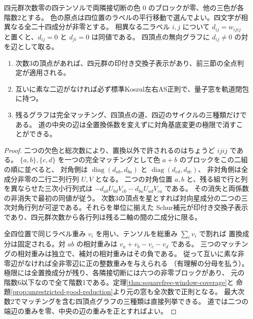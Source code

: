 \begin{proposition}\label{prop:klein-unmarked-matching-reduction}
四元群次数零の四テンソルで両隣接切断の色 $0$ のブロックが零、他の三色が各階数2とする。
色の原点は四位置のラベルの平行移動で選んでよい。四文字が相異なる全二十四成分が非零とする。
相異なる二ラベル $i,j$ について $d_{ij}=w_{ijij}$ と置くと、$d_{ij}=0$ と $d_{ji}=0$ は同値である。
四頂点の無向グラフに $d_{ij}\ne0$ の対を辺として取る。
\begin{enumerate}
\item 次数3の頂点があれば、四元群の印付き交換子表示があり、前三節の全点判定が適用される。
\item 互いに素な二辺がなければ必ず標準Koszul左右AS正則で、量子窓を軌道閉包に持つ。
\item 残るグラフは完全マッチング、四頂点の道、四辺のサイクルの三種類だけである。
道の中央の辺は全置換係数を変えずに対角基底変更の極限で消すことができる。
\end{enumerate}
\end{proposition}
\begin{proof}
二つの欠色と総次数により、置換以外で許されるのはちょうど $ijij$ である。
$\{a,b\},\{c,d\}$ を一つの完全マッチングとして色 $a+b$ のブロックをこの二組の順に並べると、
対角側は $\operatorname{diag}(d_{ab},d_{ba})$ と $\operatorname{diag}(d_{cd},d_{dc})$、
非対角側は全成分非零の二行二列行列 $U,V$ となる。
二つの対角位置 $a,b$ と、残る組で行と列を異ならせた三次小行列式は
$-d_{ab} U_{b d} V_{c b}-d_{ba} U_{a d} V_{c a}$ である。
その消失と両係数の非消失で最初の同値が従う。
次数3の頂点を星とすれば対向星成分の二つの三次対角行列が可逆である。それらを単位に揃えた
Schur補元が印付き交換子表示であり、四元群次数から各行列は残る二軸の間の二成分に限る。

全四位置で同じラベル重み $v_i$ を用い、テンソルを総重み $\sum_i v_i$ で割れば
置換成分は固定される。対 $ab$ の相対重みは $v_a+v_b-v_c-v_d$ である。
三つのマッチングの相対重みは独立で、補対の相対重みはその負である。
従って互いに素な非零辺がなければ全非零辺に正の整数重みを与えられる
（有理解の分母を払う）。極限には全置換成分が残り、各隣接切断には六つの非零ブロックがあり、
元の階数6以下なので全て階数1である。定理\ref{thm:squarefree-window-coverage}と
命題\ref{prop:unrestricted-good-reduction}より元の窓も全次数で正則となる。
最大次数2でマッチングを含む四頂点グラフの三種類は直接列挙できる。
道では二つの端辺の重みを零、中央の辺の重みを正とすればよい。
\end{proof}

